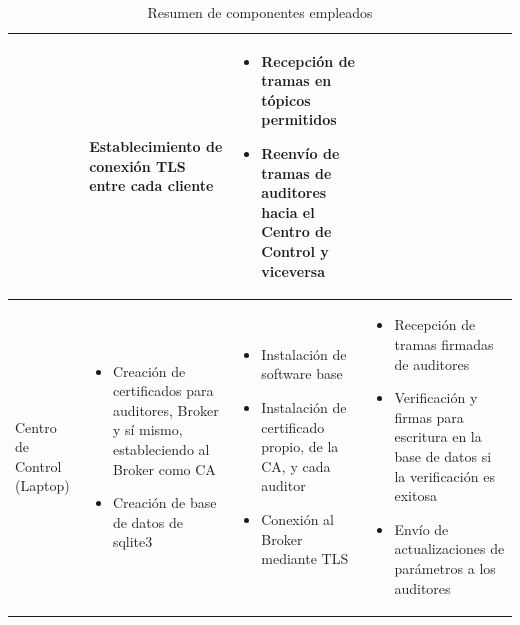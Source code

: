 \documentclass{article}
\begin{document}
\begin{table}[htbp]
{\begin{tabular}{| m{2cm} | m{4cm} | m{4cm} | m{8cm} |}
\begin{itemize}[noitemsep, leftmargin=*]
                    \end{itemize} &
                    Establecimiento de conexión TLS entre cada cliente &
                    \begin{itemize}[noitemsep, leftmargin=*]
                        \item Recepción de tramas en tópicos permitidos
                        \item Reenvío de tramas de auditores hacia el Centro de Control y viceversa
                    \end{itemize} \\
                    \hline
                    Centro de Control (Laptop) &
                    \begin{itemize}[noitemsep, leftmargin=*]
                        \item Creación de certificados para auditores, Broker y sí mismo, estableciendo al Broker como CA
                        \item Creación de base de datos de sqlite3
                    \end{itemize} &
                    \begin{itemize}[noitemsep, leftmargin=*]
                        \item Instalación de software base
                        \item Instalación de certificado propio, de la CA, y cada auditor
                        \item Conexión al Broker mediante TLS
                    \end{itemize} &
                    \begin{itemize}[noitemsep, leftmargin=*]
                        \item Recepción de tramas firmadas de auditores
                        \item Verificación y firmas para escritura en la base de datos si la verificación es exitosa
                        \item Envío de actualizaciones de parámetros a los auditores
                    \end{itemize} \\
                    \hline
                \end{tabular}}
                \caption{Resumen de componentes empleados}
                \label{tab:component_summary}
            \end{table}
\end{document}
